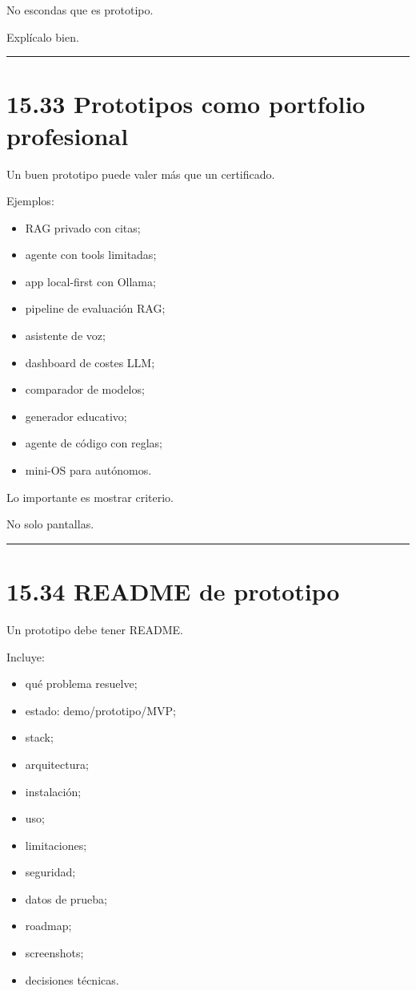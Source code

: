 No escondas que es prototipo.

Explícalo bien.

\begin{center}\rule{0.5\linewidth}{0.5pt}\end{center}

\section{15.33 Prototipos como portfolio
profesional}\label{prototipos-como-portfolio-profesional}

Un buen prototipo puede valer más que un certificado.

Ejemplos:

\begin{itemize}
\tightlist
\item
  RAG privado con citas;
\item
  agente con tools limitadas;
\item
  app local-first con Ollama;
\item
  pipeline de evaluación RAG;
\item
  asistente de voz;
\item
  dashboard de costes LLM;
\item
  comparador de modelos;
\item
  generador educativo;
\item
  agente de código con reglas;
\item
  mini-OS para autónomos.
\end{itemize}

Lo importante es mostrar criterio.

No solo pantallas.

\begin{center}\rule{0.5\linewidth}{0.5pt}\end{center}

\section{15.34 README de prototipo}\label{readme-de-prototipo}

Un prototipo debe tener README.

Incluye:

\begin{itemize}
\tightlist
\item
  qué problema resuelve;
\item
  estado: demo/prototipo/MVP;
\item
  stack;
\item
  arquitectura;
\item
  instalación;
\item
  uso;
\item
  limitaciones;
\item
  seguridad;
\item
  datos de prueba;
\item
  roadmap;
\item
  screenshots;
\item
  decisiones técnicas.
\end{itemize}

